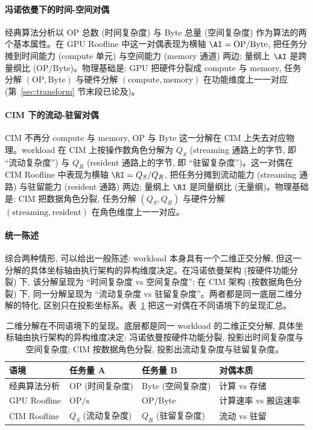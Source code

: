 \paragraph{冯诺依曼下的时间-空间对偶}
经典算法分析以 OP 总数 (时间复杂度) 与 Byte 总量 (空间复杂度) 作为算法的两个基本属性。在 GPU Roofline 中这一对偶表现为横轴 $\AI = \mathrm{OP}/\mathrm{Byte}$, 把任务分摊到时间能力 (compute 单元) 与空间能力 (memory 通道) 两边; 量纲上 $\AI$ 是跨量纲比 ($\mathrm{OP}/\mathrm{Byte}$)。物理基础是: GPU 把硬件分裂成 compute 与 memory, 任务分解 $(\mathrm{OP}, \mathrm{Byte})$ 与硬件分解 $(\text{compute}, \text{memory})$ 在功能维度上一一对应 (第~\ref{sec:transform} 节末段已论及)。

\paragraph{CIM 下的流动-驻留对偶}
CIM 不再分 compute 与 memory, $\mathrm{OP}$ 与 $\mathrm{Byte}$ 这一分解在 CIM 上失去对应物理。workload 在 CIM 上按操作数角色分解为 $Q_S$ (streaming 通路上的字节, 即 “流动复杂度”) 与 $Q_R$ (resident 通路上的字节, 即 “驻留复杂度”)。这一对偶在 CIM Roofline 中表现为横轴 $\RI = Q_S/Q_R$, 把任务分摊到流动能力 (streaming 通路) 与驻留能力 (resident 通路) 两边; 量纲上 $\RI$ 是同量纲比 (无量纲)。物理基础是: CIM 把数据角色分裂, 任务分解 $(Q_S, Q_R)$ 与硬件分解 $(\text{streaming}, \text{resident})$ 在角色维度上一一对应。

\paragraph{统一陈述}
综合两种情形, 可以给出一般陈述: workload 本身具有一个二维正交分解, 但这一分解的具体坐标轴由执行架构的异构维度决定。在冯诺依曼架构 (按硬件功能分裂) 下, 该分解呈现为 “时间复杂度 vs 空间复杂度”; 在 CIM 架构 (按数据角色分裂) 下, 同一分解呈现为 “流动复杂度 vs 驻留复杂度”。两者都是同一底层二维分解的特化, 区别只在投影坐标系。表~\ref{tab:duality_projection} 把这一对偶在不同语境下的呈现汇总。

\begin{table}[h!]
\centering
\small
\renewcommand{\arraystretch}{1.3}
\begin{tabular}{@{} l l l l @{}}
\toprule
\textbf{语境} & \textbf{任务量 A} & \textbf{任务量 B} & \textbf{对偶本质} \\
\midrule
经典算法分析 & OP (时间复杂度)  & Byte (空间复杂度) & 计算 vs 存储 \\
GPU Roofline & $\mathrm{OP}/\mathrm{s}$ & $\mathrm{OP}/\mathrm{Byte}$ & 计算速率 vs 搬运速率 \\
CIM Roofline & $Q_S$ (流动复杂度) & $Q_R$ (驻留复杂度) & 流动 vs 驻留 \\
\bottomrule
\end{tabular}
\caption{二维分解在不同语境下的呈现。底层都是同一 workload 的二维正交分解, 具体坐标轴由执行架构的异构维度决定: 冯诺依曼按硬件功能分裂, 投影出时间复杂度与空间复杂度; CIM 按数据角色分裂, 投影出流动复杂度与驻留复杂度。}
\label{tab:duality_projection}
\end{table}

